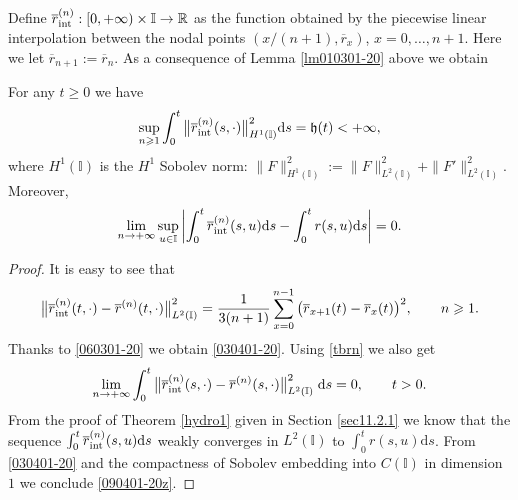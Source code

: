 \documentclass[EJP]{ejpecp} %
\newcommand\R{{\mathbb R}}
\newcommand\T{{\mathbb I}}
\renewcommand{\ge}{\geqslant}
\newcommand{\dd  }{\mathrm{d}}
\renewcommand{\bar}{\overline}
\numberwithin{equation}{section}
\begin{document}
 Define    $\bar r^{(n)}_{\rm int}:[0,+\infty)\times\T\to\R$ as the function obtained by
 the piecewise linear interpolation between the nodal points $(x/(n+1),\bar r_x)$,
 $x=0,\ldots,n+1$.  
 Here we let $\bar r_{n+1}:=\bar r_n$. As a consequence of Lemma \ref{lm010301-20} above we obtain 
 
 \begin{lemma}
\label{lm020401-20}
For any $t \ge 0$ we have
\begin{equation}
\label{030401-20}
\sup_{n\ge1}\int_0^{t}\big\| \bar r^{(n)}_{\rm int}(s,\cdot)\big\|_{H^1(\T)}^2\dd
s=\mathfrak{h}(t)<+\infty,
\end{equation}
where $H^1(\T)$ is the $H^1$ Sobolev norm: 
$
\|F\|_{H^1(\T)}^2:=\|F\|_{L^2(\T)}^2+ \|F'\|_{L^2(\T)}^2.
$ Moreover,
\begin{equation}
\label{090401-20z}
\lim_{n\to+\infty}\sup_{u\in\T}\left|\int_0^t \bar r^{(n)}_{\rm int}(s,u)\dd s-\int_0^t  r(s,u)\dd s\right|=0.
\end{equation}
\end{lemma}
 
 \begin{proof} 
 It is easy
 to see that
\begin{equation}
\label{tbrn}
\big\|\bar r^{(n)}_{\rm int}(t,\cdot)-\bar r^{(n)}(t,\cdot)\big\|_{L^2(\T)}^2=\frac{1}{3(n+1)}\sum_{x=0}^{n-1}\big(\bar r_{x+1}(t)-\bar r_x(t)\big)^2,
 \qquad n\ge1.
\end{equation}
Thanks to \eqref{060301-20} 
we obtain  \eqref{030401-20}. 
Using  \eqref{tbrn} we also get
\begin{equation}
\label{020401-20xx}
\lim_{n\to+\infty}\int_0^t\big\|\bar r^{(n)}_{\rm int}(s,\cdot)-\bar r^{(n)}(s,\cdot)\big\|_{L^2(\T)}^2 \;\dd s=0,\qquad t>0.
\end{equation}
From the proof of Theorem \ref{hydro1} given in Section \ref{sec11.2.1} we know
that the sequence
$\int_0^t \bar r^{(n)}_{\rm int}(s,u)\dd s$ weakly converges in
$L^2(\T)$ to $\int_0^t  r(s,u)\dd s$. From \eqref{030401-20}
and the compactness of Sobolev embedding into $C(\T)$ in dimension
$1$ we conclude \eqref{090401-20z}.
\end{proof}
\end{document}
